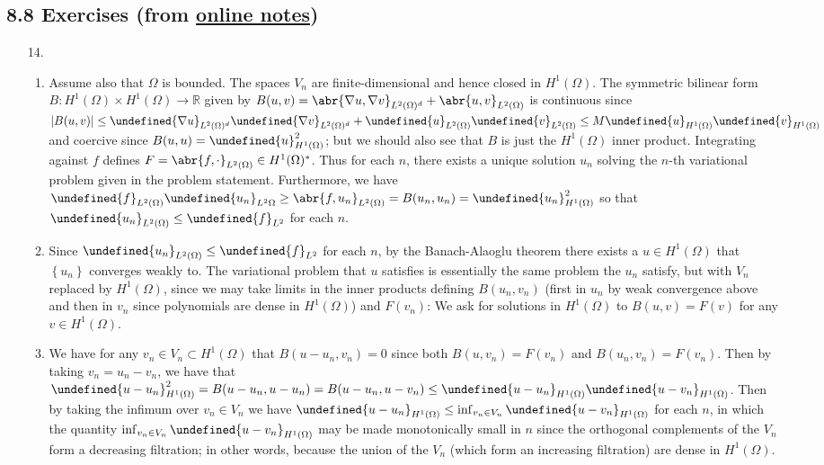 \documentclass[11pt,leqno]{article}
\theoremstyle{plain}
\theoremstyle{definition}
\numberwithin{equation}{section}
\numberwithin{lem}{section}
\newcommand{\cbr}[1]{\left\{#1\right\}}
\let\norm\undefined %
\DeclarePairedDelimiter\norm{\lVert}{\rVert}
\begin{document}
\subsection*{8.8 Exercises (from \href{https://users.oden.utexas.edu/~arbogast/appMath08c.pdf}{online notes})}
\begin{enumerate}
    \item[14.] \begin{enumerate}
        \item Assume also that $\Omega$ is bounded. The spaces $V_n$ are finite-dimensional and hence closed in $H^1(\Omega)$. The symmetric bilinear form $B\colon H^1(\Omega)\times H^1(\Omega)\to \mathbb R$ given by $B(u,v) = \abr{\nabla u,\nabla v}_{L^2(\Omega)^d} + \abr{u,v}_{L^2(\Omega)}$ is continuous since $\abs{B(u,v)}\leq \norm{\nabla u}_{L^2(\Omega)^d}\norm{\nabla v}_{L^2(\Omega)^d} + \norm{u}_{L^2(\Omega)}\norm{v}_{L^2(\Omega)}\leq M\norm{u}_{H^1(\Omega)}\norm{v}_{H^1(\Omega)}$ and coercive since $B(u,u) = \norm{u}_{H^1(\Omega)}^2$; but we should also see that $B$ is just the $H^1(\Omega)$ inner product. Integrating against $f$ defines $F = \abr{f,\cdot}_{L^2(\Omega)}\in H^1(\Omega)^\ast$. Thus for each $n$, there exists a unique solution $u_n$ solving the $n$-th variational problem given in the problem statement. Furthermore, we have $\norm{f}_{L^2(\Omega)}\norm{u_n}_{L^2{\Omega}}\geq \abr{f,u_n}_{L^2(\Omega)} = B(u_n,u_n) = \norm{u_n}_{H^1(\Omega)}^2$ so that $\norm{u_n}_{L^2(\Omega)}\leq \norm{f}_{L^2}$ for each $n$.
        \item Since $\norm{u_n}_{L^2(\Omega)}\leq \norm{f}_{L^2}$ for each $n$, by the Banach-Alaoglu theorem there exists a $u\in H^1(\Omega)$ that $\cbr{u_n}$ converges weakly to. The variational problem that $u$ satisfies is essentially the same problem the $u_n$ satisfy, but with $V_n$ replaced by $H^1(\Omega)$, since we may take limits in the inner products defining $B(u_n,v_n)$ (first in $u_n$ by weak convergence above and then in $v_n$ since polynomials are dense in $H^1(\Omega)$) and $F(v_n)$: We ask for solutions in $H^1(\Omega)$ to $B(u,v) = F(v)$ for any $v\in H^1(\Omega)$.
        \item We have for any $v_n\in V_n\subset H^1(\Omega)$ that $B(u-u_n,v_n) = 0$ since both $B(u,v_n) = F(v_n)$ and $B(u_n,v_n) = F(v_n)$. Then by taking $v_n = u_n - v_n$, we have that $\norm{u-u_n}_{H^1(\Omega)}^2 = B(u-u_n,u-u_n) = B(u-u_n,u-v_n) \leq \norm{u-u_n}_{H^1(\Omega)}\norm{u-v_n}_{H^1(\Omega)}$. Then by taking the infimum over $v_n\in V_n$ we have $\norm{u-u_n}_{H^1(\Omega)}\leq \inf_{v_n\in V_n}\norm{u-v_n}_{H^1(\Omega)}$ for each $n$, in which the quantity $\inf_{v_n\in V_n}\norm{u-v_n}_{H^1(\Omega)}$ may be made monotonically small in $n$ since the orthogonal complements of the $V_n$ form a decreasing filtration; in other words, because the union of the $V_n$ (which form an increasing filtration) are dense in $H^1(\Omega)$.

\end{enumerate}
\end{enumerate}
\end{document}
